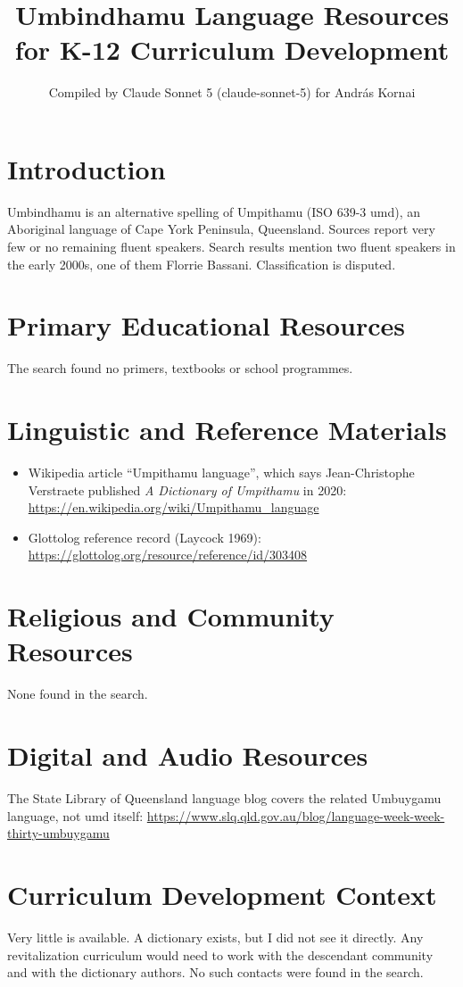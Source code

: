 \documentclass[12pt]{article}
\title{Umbindhamu Language Resources for K-12 Curriculum Development}
\author{Compiled by Claude Sonnet 5 (claude-sonnet-5) for Andr\'as Kornai}
\date{}
\begin{document}
\maketitle

\section{Introduction}
Umbindhamu is an alternative spelling of Umpithamu (ISO 639-3 umd), an Aboriginal language of Cape York Peninsula, Queensland. Sources report very few or no remaining fluent speakers. Search results mention two fluent speakers in the early 2000s, one of them Florrie Bassani. Classification is disputed.

\section{Primary Educational Resources}
The search found no primers, textbooks or school programmes.

\section{Linguistic and Reference Materials}
\begin{itemize}
\item Wikipedia article ``Umpithamu language'', which says Jean-Christophe Verstraete published \emph{A Dictionary of Umpithamu} in 2020: \url{https://en.wikipedia.org/wiki/Umpithamu_language}
\item Glottolog reference record (Laycock 1969): \url{https://glottolog.org/resource/reference/id/303408}
\end{itemize}

\section{Religious and Community Resources}
None found in the search.

\section{Digital and Audio Resources}
The State Library of Queensland language blog covers the related Umbuygamu language, not umd itself: \url{https://www.slq.qld.gov.au/blog/language-week-week-thirty-umbuygamu}

\section{Curriculum Development Context}
Very little is available. A dictionary exists, but I did not see it directly. Any revitalization curriculum would need to work with the descendant community and with the dictionary authors. No such contacts were found in the search.
\end{document}
